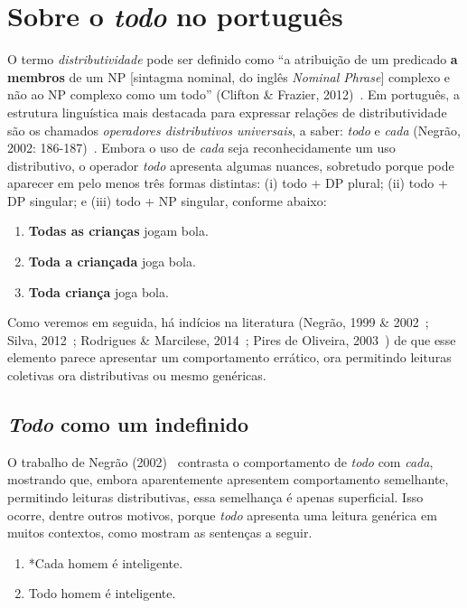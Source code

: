 \chapter{Sobre o \emph{todo} no português}
O termo \emph{distributividade} pode ser definido como ``a atribuição de um predicado \textbf{a membros} de um NP [sintagma nominal, do inglês \emph{Nominal Phrase}] complexo e não ao NP complexo como um todo'' (Clifton \& Frazier, 2012)~\cite{ClifFrazier2012}. Em português, a estrutura linguística mais destacada para expressar relações de distributividade são os chamados \emph{operadores distributivos universais}, a saber: \emph{todo} e \emph{cada} (Negrão, 2002: 186-187)~\cite{neg2002}. Embora o uso de \emph{cada} seja reconhecidamente um uso distributivo, o operador \emph{todo} apresenta algumas nuances, sobretudo porque pode aparecer em pelo menos três formas distintas: (i) todo + DP plural; (ii) todo + DP singular; e (iii) todo + NP singular, conforme abaixo:

\begin{enumerate}
  \item \textbf{Todas as crianças} jogam bola.
  \item \textbf{Toda a criançada} joga bola.
  \item \textbf{Toda criança} joga bola.
\end{enumerate}

Como veremos em seguida, há indícios na literatura (Negrão, 1999 \& 2002~\cite{neg2002}; Silva, 2012~\cite{silva2012}; Rodrigues \& Marcilese, 2014~\cite{RodMarc2014}; Pires de Oliveira, 2003~\cite{PiresOliv2003}) de que esse elemento parece apresentar um comportamento errático, ora permitindo leituras coletivas ora distributivas ou mesmo genéricas.

\section{\emph{Todo} como um indefinido}
O trabalho de Negrão (2002)~\cite{neg2002} contrasta o comportamento de \emph{todo} com \emph{cada}, mostrando que, embora aparentemente apresentem comportamento semelhante, permitindo leituras distributivas, essa semelhança é apenas superficial. Isso ocorre, dentre outros motivos,  porque \emph{todo} apresenta uma leitura genérica em muitos contextos, como mostram as sentenças a seguir.

\begin{enumerate}[resume]
    \item *Cada homem é inteligente.
    \item Todo homem é inteligente.
\end{enumerate}

